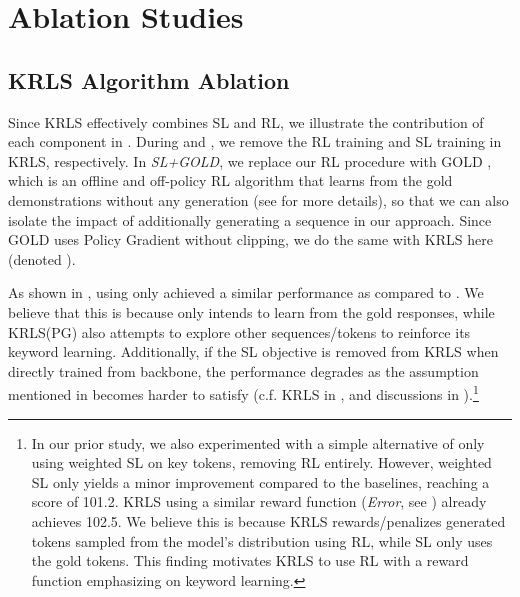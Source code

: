 \section{Ablation Studies}
\label{sec:Ablation Study}
\subsection{KRLS Algorithm Ablation}
\label{subsec:KRLS Algorithm Ablation}
Since KRLS effectively combines SL and RL, we illustrate the contribution of each component in . During  and , we remove the RL training and SL training in KRLS, respectively. In \emph{SL+GOLD}, we replace our RL procedure with GOLD \cite{GOLD}, which is an offline and off-policy RL algorithm that learns from the gold demonstrations without any generation (see  for more details), so that we can also isolate the impact of additionally generating a sequence in our approach. Since GOLD uses Policy Gradient \cite{policy-gradient} without clipping, we do the same with KRLS here (denoted ).

As shown in , using  only achieved a similar performance as compared to . We believe that this is because  only intends to learn from the gold responses, while KRLS(PG) also attempts to explore other sequences/tokens to reinforce its keyword learning. Additionally, if the SL objective is removed from KRLS when directly trained from backbone, the performance degrades as the assumption mentioned in  becomes harder to satisfy (c.f. KRLS in , and discussions in ).\footnote{In our prior study, we also experimented with a simple alternative of only using weighted SL on key tokens, removing RL entirely. However, weighted SL only yields a minor improvement compared to the baselines, reaching a score of 101.2. KRLS using a similar reward function (\emph{Error}, see ) already achieves 102.5. We believe this is because KRLS rewards/penalizes generated tokens sampled from the model's distribution using RL, while SL only uses the gold tokens. This finding motivates KRLS to use RL with a reward function emphasizing on keyword learning.}

